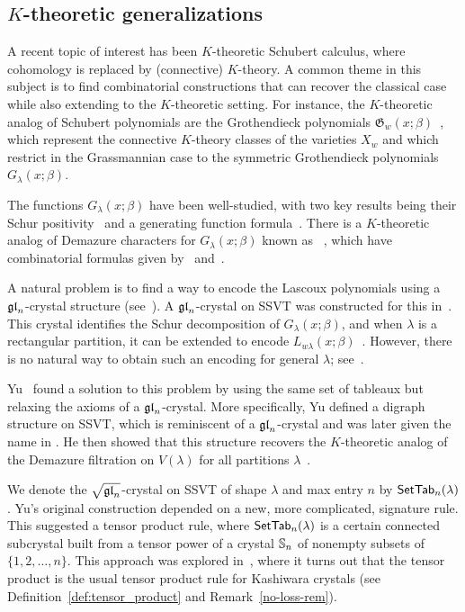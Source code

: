 \documentclass[11pt]{article}
\begin{document}
\subsection{$K$-theoretic generalizations}

A recent topic of interest has been $K$-theoretic Schubert calculus, where cohomology is replaced by (connective) $K$-theory. 
A common theme in this subject is to find  combinatorial constructions that can recover the classical case while also extending to the $K$-theoretic setting.
For instance, the $K$-theoretic analog of Schubert polynomials are the Grothendieck polynomials $\mathfrak{G}_w(x;\beta)$~\cite{LS82,LS83,LS90,FK1994}, which represent the connective $K$-theory classes of the varieties $X_w$ and which restrict in the Grassmannian case to the symmetric Grothendieck polynomials $G_{\lambda}(x; \beta)$.

The functions $G_{\lambda}(x; \beta)$ have been well-studied, with two key results being their Schur positivity~\cite{Lenart00} and a  generating function formula~\cite{Buch2002}.
There is a $K$-theoretic analog of Demazure characters for $G_{\lambda}(x; \beta)$ known as ~\cite{Kirillov16,Lascoux01,Monical16,RY15}, which have combinatorial formulas given by~\cite{BSW20} and~\cite{SY23}.

A natural problem is to find a way to encode the Lascoux polynomials using a $\mathfrak{gl}_n$-crystal structure (see~\cite[Prob.~7.13]{MPS21}).
A $\mathfrak{gl}_n$-crystal on SSVT was constructed for this in~\cite{MPS21}. This crystal identifies the Schur decomposition of $G_{\lambda}(x; \beta)$,
and when $\lambda$ is a rectangular partition, it can be extended to encode $L_{w\lambda}(x; \beta)$~\cite{MPS21,PS22}. However, there is no natural way to obtain such an encoding for general $\lambda$; see~\cite[Prop.~7.11]{MPS21}.

Yu~\cite{Yu23} found a solution to this problem by using the same set of tableaux but relaxing the axioms of a $\mathfrak{gl}_n$-crystal.
More specifically, Yu defined a digraph structure on SSVT, which is reminiscent of a $\mathfrak{gl}_n$-crystal and was later given the name  in \cite{MT2023}.
He then showed that this structure recovers the $K$-theoretic analog of the Demazure filtration on $V(\lambda)$ for all partitions $\lambda$~\cite[Thm.~5.1]{Yu23}.


We denote the $\sqrt{\mathfrak{gl}_n}$-crystal on SSVT of shape $\lambda$ and max entry $n$ by $\mathsf{SetTab}_n(\lambda)$.
Yu's original construction depended on a new, more complicated, signature rule.
This suggested a tensor product rule, where $\mathsf{SetTab}_n(\lambda)$ is a certain connected subcrystal built from a tensor power of a crystal $\mathbb{S}_n$ of nonempty subsets of $\{1,2,\dots,n\}$.
This approach was explored in~\cite{MT2023,MTY}, where it turns out that the tensor product is the usual tensor product rule for Kashiwara crystals (see Definition~\ref{def:tensor_product} and Remark~\ref{no-loss-rem}).
\end{document}
